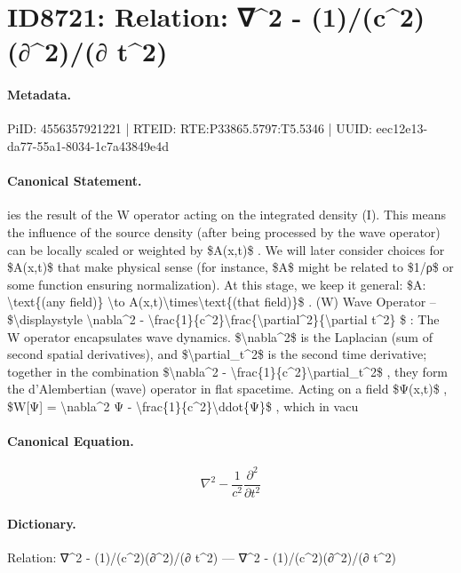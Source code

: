\section*{ID8721: Relation: ∇\textasciicircum{}2 - (1)/(c\textasciicircum{}2)(∂\textasciicircum{}2)/(∂ t\textasciicircum{}2)}
\paragraph{Metadata.}
PiID: 4556357921221 | RTEID: RTE:P33865.5797:T5.5346 | UUID: eec12e13-da77-55a1-8034-1c7a43849e4d

\paragraph{Canonical Statement.}
ies the result of the W operator acting on the integrated density (I). This means the influence of the source density (after being processed by the wave operator) can be locally scaled or weighted by \$A(x,t)\$ . We will later consider choices for \$A(x,t)\$ that make physical sense (for instance, \$A\$ might be related to \$1/ρ\$ or some function ensuring normalization). At this stage, we keep it general: \$A: \textbackslash{}text\{(any field)\} \textbackslash{}to A(x,t)\textbackslash{}times\textbackslash{}text\{(that field)\}\$ . (W) Wave Operator – \$\textbackslash{}displaystyle \textbackslash{}nabla\textasciicircum{}2 - \textbackslash{}frac\{1\}\{c\textasciicircum{}2\}\textbackslash{}frac\{\textbackslash{}partial\textasciicircum{}2\}\{\textbackslash{}partial t\textasciicircum{}2\} \$ : The W operator encapsulates wave dynamics. \$\textbackslash{}nabla\textasciicircum{}2\$ is the Laplacian (sum of second spatial derivatives), and \$\textbackslash{}partial\_t\textasciicircum{}2\$ is the second time derivative; together in the combination \$\textbackslash{}nabla\textasciicircum{}2 - \textbackslash{}frac\{1\}\{c\textasciicircum{}2\}\textbackslash{}partial\_t\textasciicircum{}2\$ , they form the d’Alembertian (wave) operator in flat spacetime. Acting on a field \$Ψ(x,t)\$ , \$W[Ψ] = \textbackslash{}nabla\textasciicircum{}2 Ψ - \textbackslash{}frac\{1\}\{c\textasciicircum{}2\}\textbackslash{}ddot\{Ψ\}\$ , which in vacu

\paragraph{Canonical Equation.}
\[
\displaystyle \nabla^2 - \frac{1}{c^2}\frac{\partial^2}{\partial t^2}
\]

\paragraph{Dictionary.}
Relation: ∇\textasciicircum{}2 - (1)/(c\textasciicircum{}2)(∂\textasciicircum{}2)/(∂ t\textasciicircum{}2) — ∇\textasciicircum{}2 - (1)/(c\textasciicircum{}2)(∂\textasciicircum{}2)/(∂ t\textasciicircum{}2)

